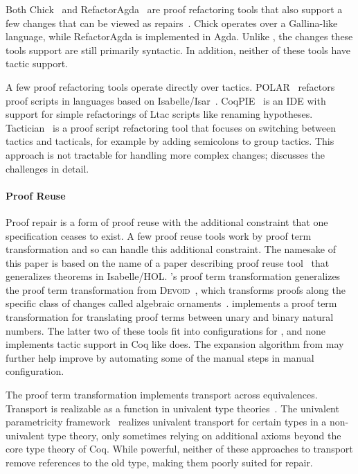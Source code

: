 Both Chick~\cite{robert2018} and RefactorAgda~\cite{wibergh2019} are proof refactoring tools that
also support a few changes that can be viewed as repairs~\cite{PGL-045}.
Chick operates over a Gallina-like language, while RefactorAgda is implemented in Agda.
Unlike \toolname, the changes these tools support are still primarily syntactic.
In addition, neither of these tools have tactic support.

A few proof refactoring tools operate directly over tactics.
POLAR~\cite{Dietrich2013} refactors proof scripts in languages based on Isabelle/Isar~\cite{Wenzel2007isar}.
CoqPIE~\cite{Roe2016} is an IDE with support for simple refactorings of Ltac scripts like renaming hypotheses.
Tactician~\cite{adams2015} is a proof script refactoring tool that focuses on switching between tactics and tacticals,
for example by adding semicolons to group tactics.
This approach is not tractable for handling more complex changes;
\citet{robert2018} discusses the challenges in detail.

\paragraph{Proof Reuse}

Proof repair is a form of proof reuse with the additional constraint that one specification ceases to exist.
A few proof reuse tools work by proof term transformation and so can handle this additional constraint.
The namesake of this paper is based on the name of a paper describing proof reuse tool~\cite{Johnsen2004}
that generalizes theorems in Isabelle/HOL.
\toolname's proof term transformation generalizes the proof term transformation from \textsc{Devoid}~\cite{Ringer2019},
which transforms proofs along the specific class of changes called algebraic ornaments~\cite{mcbride}.
\citet{magaud2000changing} implements a proof term transformation for translating proof terms between
unary and binary natural numbers. 
The latter two of these tools fit into configurations for \toolname,
and none implements tactic support in Coq like \toolname does.
The expansion algorithm from \citet{magaud2000changing} may further help improve \toolname
by automating some of the manual steps in manual configuration.

The \toolname proof term transformation implements transport across equivalences.
Transport is realizable as a function in univalent type theories~\cite{univalent2013homotopy}.
The univalent parametricity framework~\cite{tabareau2017equivalences} realizes univalent transport for certain types
in a non-univalent type theory, only sometimes relying on additional axioms beyond the core type theory of Coq.
While powerful, neither of these approaches to transport remove references to the old type, making them poorly suited for repair.

